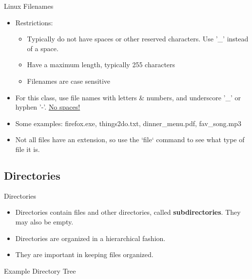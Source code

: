 \documentclass[graphics]{beamer}
\begin{document}
\begin{frame}{Linux Filenames}
    \begin{itemize}
        \item Restrictions:
        \begin{itemize}
            \item Typically do not have spaces or other reserved characters. Use '\_' instead of a space.
            \item Have a maximum length, typically 255 characters
            \item Filenames are case sensitive
        \end{itemize}
        \item For this class, use file names with letters \& numbers, and underscore '\_' or hyphen '-'. \underline{No spaces!}
        \item Some examples: firefox.exe, things2do.txt, dinner\_menu.pdf, fav\_song.mp3
        \item Not all files have an extension, so use the `file` command to see what type of file it is.
    \end{itemize}
\end{frame}

\subsection{Directories}
\begin{frame}{Directories}
    \begin{itemize}
        \item Directories contain files and other directories, called \textbf{subdirectories}. They may also be empty.
        \item Directories are organized in a hierarchical fashion.
        \item They are important in keeping files organized.
    \end{itemize}
\end{frame}

\begin{frame}{Example Directory Tree}
    
\end{frame}
\end{document}
